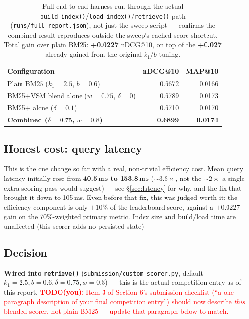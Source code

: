 \documentclass[11pt]{article}
\newcommand{\todo}[1]{\textcolor{red}{\textbf{TODO(you):} #1}}
\begin{document}
\begin{table}[h]
\centering
\begin{tabular}{lrr}
\toprule
Configuration & nDCG@10 & MAP@10 \\
\midrule
Plain BM25 ($k_1{=}2.5$, $b{=}0.6$) & 0.6672 & 0.0166 \\
BM25+VSM blend alone ($w{=}0.75$, $\delta{=}0$) & 0.6789 & 0.0173 \\
BM25+ alone ($\delta{=}0.1$) & 0.6710 & 0.0170 \\
\textbf{Combined (}$\delta{=}0.75$\textbf{,} $w{=}0.8$\textbf{)} & \textbf{0.6899} & \textbf{0.0174} \\
\bottomrule
\end{tabular}
\caption{Full end-to-end harness run through the actual
\texttt{build\_index()}/\texttt{load\_index()}/\texttt{retrieve()} path
(\texttt{runs/full\_report.json}), not just the sweep script --- confirms
the combined result reproduces outside the sweep's cached-score
shortcut. Total gain over plain BM25: \textbf{+0.0227} nDCG@10, on top of
the \textbf{+0.027} already gained from the original $k_1$/$b$ tuning.}
\end{table}

\subsection{Honest cost: query latency}
This is the one change so far with a real, non-trivial efficiency cost.
Mean query latency initially rose from \textbf{40.5\,ms to 153.8\,ms}
(${\sim}3.8\times$, not the ${\sim}2\times$ a single extra scoring pass
would suggest) --- see \S\ref{sec:latency} for why, and the fix that
brought it down to 105\,ms. Even before that fix, this was judged worth
it: the efficiency component is only $\pm10\%$ of the leaderboard score,
against a $+0.0227$ gain on the 70\%-weighted primary metric. Index size
and build/load time are unaffected (this scorer adds no persisted
state).

\subsection{Decision}
\textbf{Wired into \texttt{retrieve()}}
(\texttt{submission/custom\_scorer.py}, default
$k_1{=}2.5,b{=}0.6,\delta{=}0.75,w{=}0.8$) --- this is the actual
competition entry as of this report. \todo{Item 3 of Section 6's
submission checklist (``a one-paragraph description of your final
competition entry'') should now describe \emph{this} blended scorer, not
plain BM25 --- update that paragraph below to match.}
\end{document}
